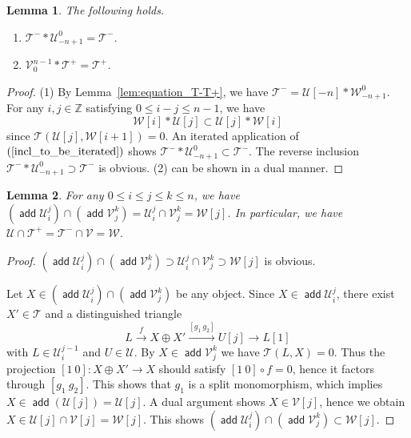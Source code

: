 \documentclass[a4paper,reqno,10pt]{amsart}
\newtheorem{lemma}[lemma]{Lemma}
\theoremstyle{definition}
\theoremstyle{definition}
\theoremstyle{definition}
\theoremstyle{definition}
\theoremstyle{plain}
\def\add{\operatorname{\mathsf{add}}}
\newcommand{\BZ}{\mathbb{Z}}
\newcommand{\CT}{\mathcal{T}}
\newcommand{\CU}{\mathcal{U}}
\newcommand{\CV}{\mathcal{V}}
\newcommand{\CW}{\mathcal{W}}
\begin{document}
\begin{lemma}\label{lem:T-_*_<1>}
The following holds.
\begin{enumerate}
\item $\CT^-\ast\CU_{-n+1}^0=\CT^-$.
\item $\CV_0^{n-1}\ast\CT^+=\CT^+$.
\end{enumerate}
\end{lemma}
\begin{proof}
{\rm (1)} By Lemma~\ref{lem:equation_T-T+}, we have $\CT^-=\CU[-n]\ast\CW_{-n+1}^0$. For any $i,j\in\BZ$ satisfying $0\le i-j\le n-1$, we have
\begin{equation}\label{incl_to_be_iterated}
\CW[i]\ast\CU[j]\subset \CU[j]\ast\CW[i]
\end{equation}
since $\CT(\CU[j],\CW[i+1])=0$. An iterated application of $(\ref{incl_to_be_iterated})$ shows $\CT^-\ast\CU_{-n+1}^0\subset\CT^-$. The reverse inclusion $\CT^-\ast\CU_{-n+1}^0\supset\CT^-$ is obvious.
{\rm (2)} can be shown in a dual manner.
\end{proof}

\begin{lemma}\label{lem:cotors_1-n}
For any $0\le i\le j\le k\le n$, we have
$(\add\CU_i^j)\cap(\add\CV_j^k)=\CU_i^j\cap\CV_j^k=\CW[j]$.
In particular, we have $\CU\cap\CT^+=\CT^-\cap\CV=\CW$.
\end{lemma}
\begin{proof}
$(\add\CU_i^j)\cap(\add\CV_j^k)\supset\CU_i^j\cap\CV_j^k\supset\CW[j]$ is obvious. 

Let $X\in(\add\CU_i^j)\cap(\add\CV_j^k)$ be any object.
Since $X\in\add\CU_i^j$, there exist $X'\in\CT$ and a distinguished triangle
\[
L\xrightarrow{f}X\oplus X'\xrightarrow{[g_1\ g_2]}U[j]\to L[1]
\]
with $L\in\CU_i^{j-1}$ and $U\in\CU$. By $X\in\add\CV_j^k$ we have $\CT(L,X)=0$. Thus the projection $[1\ 0]\colon X\oplus X'\to X$ should satisfy $[1\ 0]\circ f=0$, hence it factors through $[g_1\ g_2]$. This shows that $g_1$ is a split monomorphism, which implies $X\in\add(\CU[j])=\CU[j]$. A dual argument shows $X\in\CV[j]$, hence we obtain $X\in\CU[j]\cap\CV[j]=\CW[j]$. This shows $(\add\CU_i^j)\cap(\add\CV_j^k)\subset\CW[j]$.
\end{proof}
\end{document}

